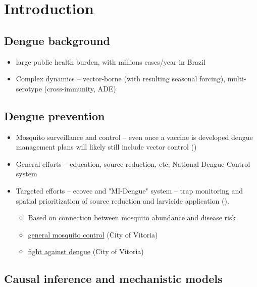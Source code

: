 \documentclass[10pt,letterpaper]{article}
\begin{document}
\linenumbers

\section*{Introduction}


\subsection*{Dengue background}
\begin{itemize}
  \item large public health burden, with millions cases/year in Brazil
  \item Complex dynamics -- vector-borne (with resulting seasonal forcing), multi-serotype (cross-immunity, ADE)
\end{itemize}

\subsection*{Dengue prevention}
\begin{itemize}
  \item Mosquito surveillance and control -- even once a vaccine is developed dengue management plans will likely still include vector control (\cite{Achee2015})
  \item General efforts -- education, source reduction, etc; National Dengue Control system
  \item Targeted efforts -- ecovec and "MI-Dengue" system -- trap monitoring and spatial prioritization of source reduction and larvicide application (\cite{Eiras2009}).
  \begin{itemize}
  \item Based on connection between mosquito abundance and disease risk
  \item \href{http://www.vitoria.es.gov.br/prefeitura/mosquito-controle-ajuda-a-reduzir-incidencia-de-viroses}{general mosquito control} (City of Vitoria)
  \item \href{http://www.vitoria.es.gov.br/prefeitura/combateadengue}{fight against dengue} (City of Vitoria)
  \end{itemize}
\end{itemize}

\subsection*{Causal inference and mechanistic models}
\end{document}
